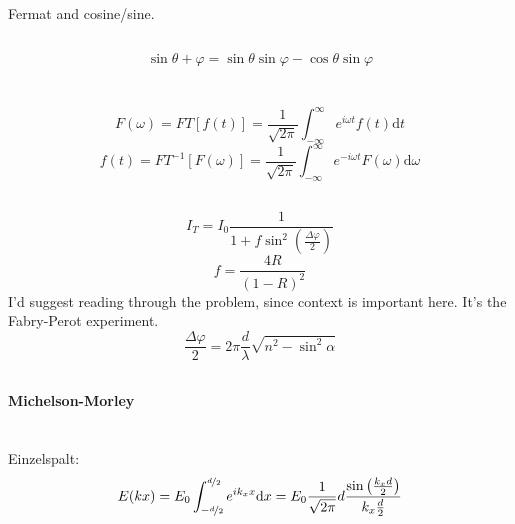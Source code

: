 \documentclass[12pt]{report}
\newcommand{\vphi}{\varphi}
\newcommand{\dd}{\mathrm{d}}
\begin{document}
\subsection{}

Fermat and cosine/sine.

\subsection{}
\[\sin\theta+\vphi=\sin\theta\sin\vphi-\cos\theta\sin\vphi\]

\section{}

\subsection{}
\[F(\omega)=FT[f(t)]=\frac{1}{\sqrt{2\pi}}\int_{-\infty}^\infty e^{i\omega t}f(t)\dd t\]
\[f(t)=FT^{-1}[F(\omega)]=\frac{1}{\sqrt{2\pi}}\int_{-\infty}^\infty e^{-i\omega t}F(\omega)\dd\omega\]

\subsection{}

\[I_T=I_0\frac{1}{1+f\sin^2\left(\frac{\Delta\vphi}{2}\right)}\]
\[f=\frac{4R}{(1-R)^2}\]
I'd suggest reading through the problem, since context is important here. It's the Fabry-Perot experiment.
\[\frac{\Delta\vphi}{2}=2\pi\frac{d}{\lambda}\sqrt{n^2-\sin^2\alpha}\]

\subsection{}

\textbf{Michelson-Morley}

\section{}

\subsection{}

Einzelspalt:
\[E(kx)=E_0\int_{-\nicefrac{d}{2}}^{\nicefrac{d}{2}}e^{ik_xx}\dd x=E_0\frac{1}{\sqrt{2\pi}}d\frac{\sin\left(\frac{k_xd}{2}\right)}{k_x\frac{d}{2}}\]
\end{document}
